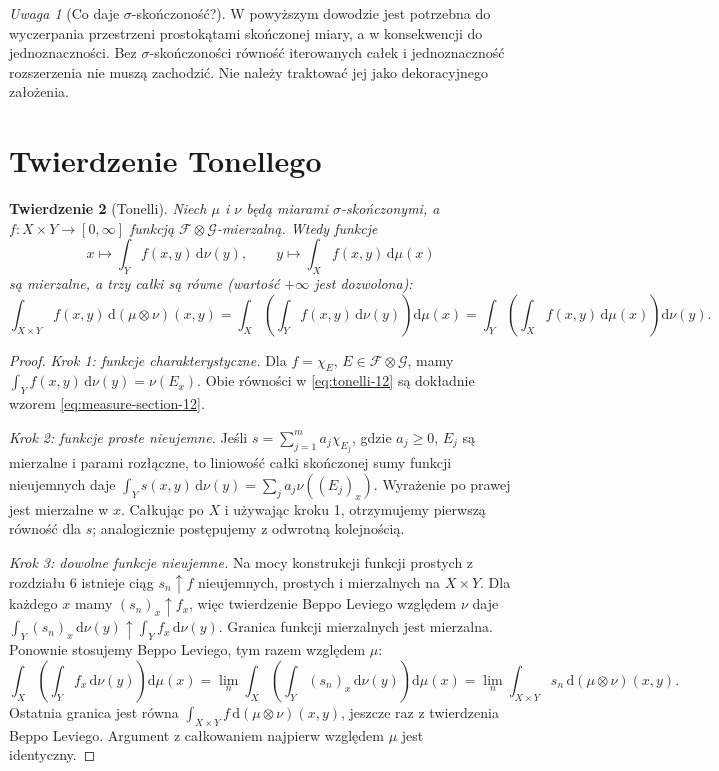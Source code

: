 \documentclass[11pt,a4paper,oneside]{book}
\numberwithin{equation}{chapter}
\theoremstyle{plain}
\newtheorem{twierdzenie}{Twierdzenie}[chapter]
\theoremstyle{definition}
\theoremstyle{remark}
\newtheorem{uwaga}[twierdzenie]{Uwaga}
\begin{document}
\begin{uwaga}[Co daje $\sigma$-skończoność?]
W powyższym dowodzie jest potrzebna do
wyczerpania przestrzeni prostokątami skończonej
miary, a w konsekwencji do jednoznaczności.
Bez $\sigma$-skończoności równość iterowanych całek
i jednoznaczność rozszerzenia nie muszą zachodzić.
Nie należy traktować jej jako dekoracyjnego założenia.
\end{uwaga}

\section{Twierdzenie Tonellego}

\begin{twierdzenie}[Tonelli]
\label{thm:tonelli-12}
Niech $\mu$ i $\nu$ będą miarami $\sigma$-skończonymi,
a $f:X\times Y\to[0,\infty]$ funkcją
$\mathcal F\otimes\mathcal G$-mierzalną.
Wtedy funkcje
\[
x\longmapsto\int_Y f(x,y)\,\mathrm d\nu(y),
\qquad
y\longmapsto\int_X f(x,y)\,\mathrm d\mu(x)
\]
są mierzalne, a trzy całki są równe
(wartość $+\infty$ jest dozwolona):
\begin{equation}\label{eq:tonelli-12}
\int_{X\times Y}f(x,y)\,\mathrm d(\mu\otimes\nu)(x,y)
=\int_X\left(\int_Yf(x,y)\,\mathrm d\nu(y)\right)
\mathrm d\mu(x)
=\int_Y\left(\int_Xf(x,y)\,\mathrm d\mu(x)\right)
\mathrm d\nu(y).
\end{equation}
\end{twierdzenie}
\begin{proof}
\emph{Krok 1: funkcje charakterystyczne.}
Dla $f=\chi_E$, $E\in\mathcal F\otimes\mathcal G$,
mamy $\int_Yf(x,y)\,\mathrm d\nu(y)=\nu(E_x)$.
Obie równości w \eqref{eq:tonelli-12} są dokładnie
wzorem \eqref{eq:measure-section-12}.

\emph{Krok 2: funkcje proste nieujemne.}
Jeśli $s=\sum_{j=1}^m a_j\chi_{E_j}$,
gdzie $a_j\ge0$, $E_j$ są mierzalne i parami
rozłączne, to liniowość całki skończonej sumy
funkcji nieujemnych daje
$\int_Y s(x,y)\,\mathrm d\nu(y)
=\sum_j a_j\nu((E_j)_x)$.
Wyrażenie po prawej jest mierzalne w $x$.
Całkując po $X$ i używając kroku 1,
otrzymujemy pierwszą równość dla $s$;
analogicznie postępujemy z odwrotną kolejnością.

\emph{Krok 3: dowolne funkcje nieujemne.}
Na mocy konstrukcji funkcji prostych z rozdziału 6
istnieje ciąg $s_n\uparrow f$ nieujemnych,
prostych i mierzalnych na $X\times Y$.
Dla każdego $x$ mamy $(s_n)_x\uparrow f_x$,
więc twierdzenie Beppo Leviego względem $\nu$
daje $\int_Y(s_n)_x\,\mathrm d\nu(y)\uparrow
\int_Yf_x\,\mathrm d\nu(y)$. Granica funkcji
mierzalnych jest mierzalna. Ponownie stosujemy
Beppo Leviego, tym razem względem $\mu$:
\[
\int_X\left(\int_Y f_x\,\mathrm d\nu(y)\right)\mathrm d\mu(x)
=\lim_n\int_X\left(\int_Y (s_n)_x\,\mathrm d\nu(y)\right)\mathrm d\mu(x)
=\lim_n\int_{X\times Y}s_n\,\mathrm d(\mu\otimes\nu)(x,y).
\]
Ostatnia granica jest równa
$\int_{X\times Y}f\,\mathrm d(\mu\otimes\nu)(x,y)$,
jeszcze raz z twierdzenia Beppo Leviego.
Argument z całkowaniem najpierw względem $\mu$
jest identyczny.
\end{proof}
\end{document}
